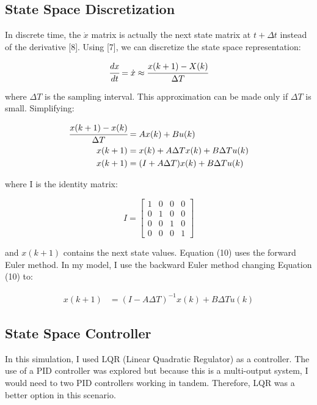 \documentclass{article}
\begin{document}
\subsection{State Space Discretization}

In discrete time, the $\Dot{x}$ matrix is actually the next state matrix at $t + \Delta{t}$ instead of the derivative [8]. Using [7], we can discretize the state space representation:

\begin{align}
    \cfrac{dx}{dt} = \Dot{x} \approx \cfrac{x(k+1)- X(k)}{\Delta{T}}
\end{align}

\noindent where $\Delta{T}$ is the sampling interval. This approximation can be made only if $\Delta{T}$ is small. Simplifying: 

\begin{align}
    \cfrac{x(k+1)- x(k)}{\Delta{T}} & = Ax(k) + Bu(k) \\ 
    x(k+1) & = x(k) + A\Delta T x(k) + B\Delta T u(k) \\
    x(k+1) & = (I + A\Delta T)x(k) + B\Delta T u(k)
\end{align}

\noindent where I is the identity matrix:

\begin{equation}
    I = 
    \begin{bmatrix}
        1&0&0&0 \\
        0&1&0&0 \\
        0&0&1&0 \\
        0&0&0&1
    \end{bmatrix}
\end{equation}

\noindent and $x(k+1)$ contains the next state values. Equation (10) uses the forward Euler method. In my model, I use the backward Euler method changing Equation (10) to:

\begin{align}
    x(k+1) & = (I - A\Delta T)^{-1}x(k) + B\Delta T u(k)
\end{align}

\subsection{State Space Controller}

In this simulation, I used LQR (Linear Quadratic Regulator) as a controller. The use of a PID controller was explored but because this is a multi-output system, I would need to two PID controllers working in tandem. Therefore, LQR was a better option in this scenario.
\end{document}
